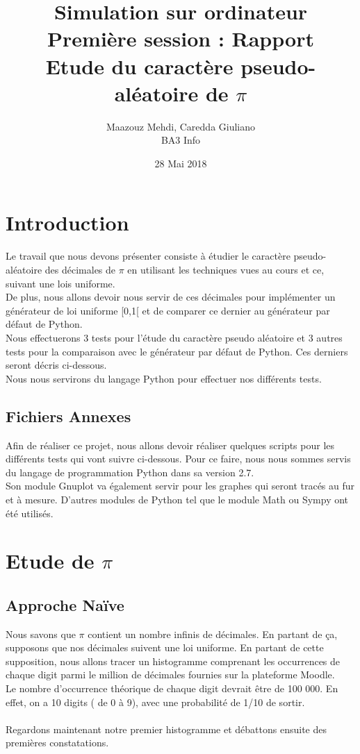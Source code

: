 \documentclass[french]{article}
\title{Simulation sur ordinateur \\ Première session : Rapport \\ Etude du caractère pseudo-aléatoire de $\pi$}
\author{Maazouz Mehdi, Caredda Giuliano \\ BA3 Info}
\date{28 Mai 2018}
\begin{document}
\maketitle
\newpage
\renewcommand{\contentsname}{Sommaire}
\tableofcontents
\newpage

\section{Introduction}
Le travail que nous devons présenter consiste à étudier le caractère pseudo-aléatoire des décimales de $\pi$
en utilisant les techniques vues au cours et ce, suivant une lois uniforme. \\
De plus, nous allons devoir nous servir de ces décimales pour implémenter un générateur de loi uniforme [0,1[ 
et de comparer ce dernier au générateur par défaut de Python. \\
Nous effectuerons 3 tests pour l'étude du caractère pseudo aléatoire et 3 autres tests pour la comparaison avec le générateur par défaut de Python. Ces derniers seront décris ci-dessous. \\
Nous nous servirons du langage Python pour effectuer nos différents tests.

\subsection{Fichiers Annexes}
Afin de réaliser ce projet, nous allons devoir réaliser quelques scripts pour les différents tests qui 
vont suivre ci-dessous. Pour ce faire, nous nous sommes servis du langage de programmation Python dans sa version 2.7. 
\\
Son module Gnuplot va également servir pour les graphes qui seront tracés au fur et à mesure. D'autres modules de Python tel que le module Math ou Sympy ont été utilisés.

\section{Etude de $\pi$ }
\subsection{Approche Naïve}
Nous savons que $\pi$ contient un nombre infinis de décimales. En partant de ça, supposons que nos décimales suivent une loi uniforme. En partant de cette supposition, nous allons tracer un histogramme comprenant les occurrences de chaque digit parmi le million de décimales fournies sur la plateforme Moodle.
\\
Le nombre d'occurrence théorique de chaque digit devrait être de 100 000. En effet, on a 10 digits ( de 0 à 9), avec une probabilité de 1/10 de sortir.
\\
\\
Regardons maintenant notre premier histogramme et débattons ensuite des premières constatations.
\end{document}
